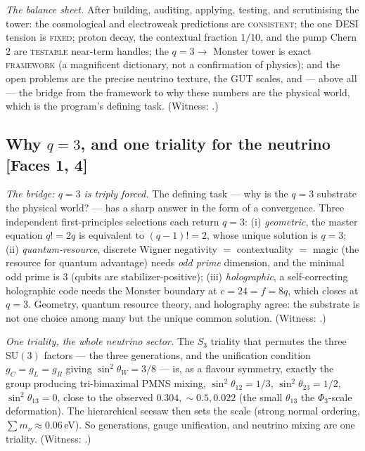 \documentclass[11pt]{article}
\begin{document}
\emph{The balance sheet.} After building, auditing, applying, testing, and
scrutinising the tower: the cosmological and electroweak predictions are
\textsc{consistent}; the one DESI tension is \textsc{fixed}; proton decay, the
contextual fraction $1/10$, and the pump Chern $2$ are \textsc{testable} near-term
handles; the $q=3\to$ Monster tower is exact \textsc{framework} (a magnificent
dictionary, not a confirmation of physics); and the open problems are the precise
neutrino texture, the GUT scales, and --- above all --- the bridge from the
framework to why these numbers are the physical world, which is the program's
defining task. (Witness: .)

\subsection{Why \texorpdfstring{$q=3$}{q=3}, and one triality for the neutrino \texorpdfstring{\normalfont\small[Faces 1, 4]}{[Faces 1, 4]}}
\label{sec:why-q3}

\emph{The bridge: $q=3$ is triply forced.} The defining task --- why is the
$q=3$ substrate the physical world? --- has a sharp answer in the form of a
convergence. Three independent first-principles selections each return $q=3$:
(i) \emph{geometric}, the master equation $q!=2q$ is equivalent to $(q-1)!=2$,
whose unique solution is $q=3$; (ii) \emph{quantum-resource}, discrete Wigner
negativity $=$ contextuality $=$ magic (the resource for quantum advantage) needs
\emph{odd prime} dimension, and the minimal odd prime is $3$ (qubits are
stabilizer-positive); (iii) \emph{holographic}, a self-correcting holographic
code needs the Monster boundary at $c=24=f=8q$, which closes at $q=3$. Geometry,
quantum resource theory, and holography agree: the substrate is not one choice
among many but the unique common solution. (Witness:
.)

\emph{One triality, the whole neutrino sector.} The $S_3$ triality that permutes
the three $\mathrm{SU}(3)$ factors --- the three generations, and the unification
condition $g_C=g_L=g_R$ giving $\sin^2\theta_W=3/8$ --- is, as a flavour symmetry,
exactly the group producing tri-bimaximal PMNS mixing,
$\sin^2\theta_{12}=1/3$, $\sin^2\theta_{23}=1/2$, $\sin^2\theta_{13}=0$, close to
the observed $0.304,\sim\!0.5,0.022$ (the small $\theta_{13}$ the $\Phi_3$-scale
deformation). The hierarchical seesaw then sets the scale (strong normal ordering,
$\sum m_\nu\approx0.06$\,eV). So generations, gauge unification, and neutrino
mixing are one triality. (Witness: .)
\end{document}
